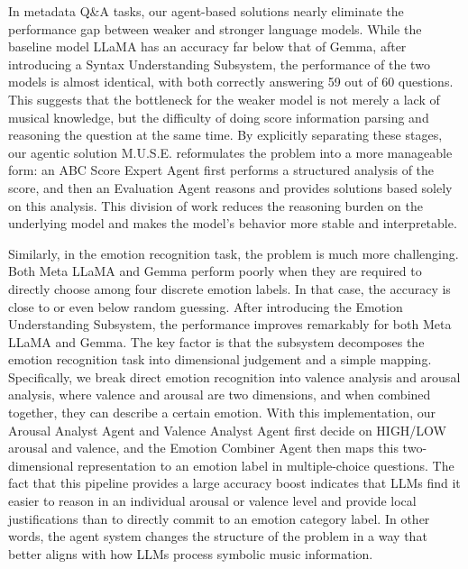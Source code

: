 \documentclass[sigconf]{acmart}
\begin{document}
In metadata Q\&A tasks, our agent-based solutions nearly eliminate the performance gap between weaker and stronger language models. While the baseline model LLaMA has an accuracy far below that of Gemma, after introducing a Syntax Understanding Subsystem, the performance of the two models is almost identical, with both correctly answering 59 out of 60 questions. This suggests that the bottleneck for the weaker model is not merely a lack of musical knowledge, but the difficulty of doing score information parsing and reasoning the question at the same time. By explicitly separating these stages, our agentic solution M.U.S.E. reformulates the problem into a more manageable form: an ABC Score Expert Agent first performs a structured analysis of the score, and then an Evaluation Agent reasons and provides solutions based solely on this analysis. This division of work reduces the reasoning burden on the underlying model and makes the model's behavior more stable and interpretable.

Similarly, in the emotion recognition task, the problem is much more challenging. Both Meta LLaMA and Gemma perform poorly when they are required to directly choose among four discrete emotion labels. In that case, the accuracy is close to or even below random guessing. After introducing the Emotion Understanding Subsystem, the performance improves remarkably for both Meta LLaMA and Gemma. The key factor is that the subsystem decomposes the emotion recognition task into dimensional judgement and a simple mapping. Specifically, we break direct emotion recognition into valence analysis and arousal analysis, where valence and arousal are two dimensions, and when combined together, they can describe a certain emotion. With this implementation, our Arousal Analyst Agent and Valence Analyst Agent first decide on HIGH/LOW arousal and valence, and the Emotion Combiner Agent then maps this two-dimensional representation to an emotion label in multiple-choice questions. The fact that this pipeline provides a large accuracy boost indicates that LLMs find it easier to reason in an individual arousal or valence level and provide local justifications than to directly commit to an emotion category label. In other words, the agent system changes the structure of the problem in a way that better aligns with how LLMs process symbolic music information.
\end{document}
